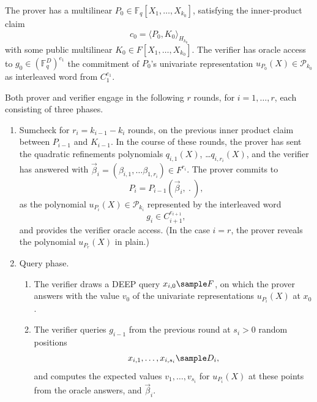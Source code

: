 \begin{protocol}[WHIR]
\label{prot:WHIR}
The prover has a multilinear $P_{0}\in \mathbb F_q[X_1,\ldots, X_{k_0}]$, satisfying the inner-product claim
\[
c_0 = \langle P_{0}, K_0 \rangle_{H_{k_0}} 
\]
with some public multilinear $K_{0}\in F[X_1,\ldots, X_{k_0}]$.
The verifier has oracle access to $g_{0}\in (\mathbb F_q^D)^{e_1}$ the commitment of $P_0$'s univariate representation $u_{P_0}(X)\in \mathscr P_{k_0}$ as interleaved word from $C_1^{e_1}$.

Both prover and verifier engage in the following $r$ rounds, for $i=1,\ldots, r$, each consisting of three phases. 
\begin{enumerate}
    \item 
    Sumcheck for $r_i = k_{i-1} - k_i$ rounds, on the previous inner product claim between $P_{i-1}$ and $K_{i-1}$.
    In the course of these rounds, the prover has sent the quadratic refinements polynomials $q_{i,1}(X)$, \ldots $q_{i,r_i}(X)$, and the verifier has answered with $\vec\beta_i = (\beta_{i,1}, \ldots \beta_{1, r_i})\in F^{r_i}$.
    The prover commits to 
    \[
    P_{i} = P_{i-1}(\vec \beta_{i},\:.\:), 
    \]
    as the polynomial $u_{P_i}(X)\in \mathscr P_{k_i}$ represented by the interleaved word
    \[
    g_{i}  \in C_{i+1}^{e_{i+1}},
    \]
    and provides the verifier oracle access.
    (In the case $i=r$, the prover reveals the polynomial $u_{P_r}(X)$ in plain.)
    \item 
    Query phase. 
    \begin{enumerate}
    \item
    The verifier draws a DEEP query $x_{i,0} \sample F$, on which the prover answers with the value $v_{0}$ of the univariate representations $u_{P_i}(X)$ at $x_{0}$.  
    \item 
    The verifier queries $g_{i-1}$ from the previous round at $s_i>0$ random positions 
    \[
    x_{i,1}, \ldots, x_{i,s_i} \sample D_{i},
    \]
    and computes the expected values $v_{1}, \ldots, v_{s_i}$ for $u_{P_{i}}(X)$ at these points from the oracle answers, and $\vec\beta_i$.

\end{enumerate}
\end{enumerate}
\end{protocol}
